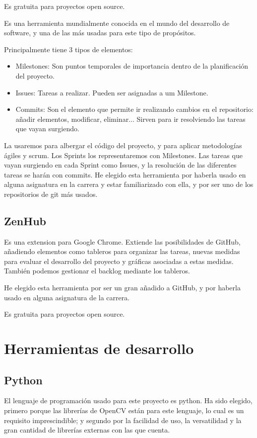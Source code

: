 Es gratuita para proyectos open source.

Es una herramienta mundialmente conocida en el mundo del desarrollo de software, y una de las más usadas para este tipo de propósitos.

Principalmente tiene 3 tipos de elementos:
\begin{itemize}
	\item Milestones: Son puntos temporales de importancia dentro de la planificación del proyecto.
	\item Issues: Tareas a realizar. Pueden ser asignadas a um Milestone. 
 	\item Commits: Son el elemento que permite ir realizando cambios en el repositorio: añadir elementos, modificar, eliminar... Sirven para ir resolviendo las tareas que vayan surgiendo.
\end{itemize}

La usaremos para albergar el código del proyecto, y para aplicar metodologías ágiles y scrum. Los Sprints los representaremos con Milestones. Las tareas que vayan surgiendo en cada Sprint como Issues, y la resolución de las diferentes tareas se harán con commits. He elegido esta herramienta por haberla usado en alguna asignatura en la carrera y estar familiarizado con ella, y por ser uno de los repositorios de git más usados.

\subsection{ZenHub}
Es una extension para Google Chrome. Extiende las posibilidades de GitHub, añadiendo elementos como tableros para organizar las tareas, nuevas medidas para evaluar el desarrollo del proyecto y gráficas asociadas a estas medidas. También podemos gestionar el backlog mediante los tableros.

He elegido esta herramienta por ser un gran añadido a GitHub, y por haberla usado en alguna asignatura de la carrera.  

Es gratuita para proyectos open source.


\section{Herramientas de desarrollo}

\subsection{Python}
El lenguaje de programación usado para este proyecto es python. Ha sido elegido, primero porque las librerías de OpenCV están para este lenguaje, lo cual es un requisito imprescindible; y segundo por la facilidad de uso, la versatilidad y la gran cantidad de librerías externas con las que cuenta.

